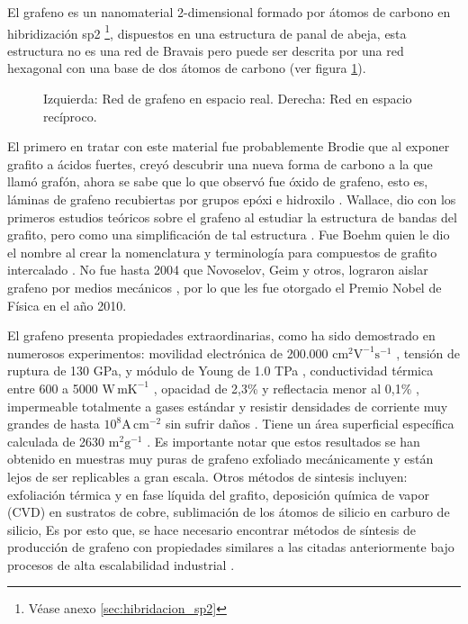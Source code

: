 
El grafeno es un nanomaterial 2-dimensional formado por átomos de carbono en hibridización sp2 \footnote{Véase anexo \ref{sec:hibridacion_sp2}}, dispuestos en una estructura de panal de abeja, esta estructura no es una red de Bravais pero puede ser descrita por una red hexagonal con una base de dos átomos de carbono (ver figura \ref{fig_graphene_lattice}). 

\begin{figure}
	\centering
	\caption[Estructura cristalina del grafeno]{Izquierda: Red de grafeno en espacio real. Derecha: Red en espacio recíproco.}
	\label{fig_graphene_lattice}
\end{figure}

El primero en tratar con este material fue probablemente Brodie \citep{Brodie1859} que al exponer grafito a ácidos fuertes, creyó descubrir una nueva forma de carbono a la que llamó grafón, ahora se sabe que lo que observó fue óxido de grafeno, esto es, láminas de grafeno recubiertas por grupos epóxi e hidroxilo \citep{Geim2012}. Wallace, dio con los primeros estudios teóricos sobre el grafeno al estudiar la estructura de bandas del grafito, pero como una simplificación de tal estructura \citep{Wallace1947}. Fue Boehm quien le dio el nombre al crear la nomenclatura y terminología para compuestos de grafito intercalado \citep{Boehm1986}. No fue hasta 2004 que Novoselov, Geim y otros, lograron aislar grafeno por medios mecánicos \citep{Novoselov2004}, por lo que les fue otorgado el Premio Nobel de Física en el año 2010.

El grafeno presenta propiedades extraordinarias, como ha sido demostrado en numerosos experimentos: movilidad electrónica de 200.000 $\mathrm{cm^2 V^{-1} s^{-1} }$ \citep{Bolotin2008}, tensión de ruptura de 130 GPa, y módulo de Young de 1.0 TPa \citep{Lee2008}, conductividad térmica entre 600 a 5000 $\mathrm{W\, mK^{-1}}$ \citep{Balandin2011}, opacidad de 2,3\% y reflectacia menor al 0,1\% \citep{Nair2008}, impermeable totalmente a gases estándar \citep{Bunch2008} y resistir densidades de corriente muy grandes de hasta $\mathrm{10^8 A\, cm^{-2}}$ sin sufrir daños  \citep{Moser2007}. Tiene un área superficial específica calculada de 2630 $\mathrm{m^2 g^{-1}}$ \citep{Peigney2001}. Es importante notar que estos resultados se han obtenido en muestras muy puras de grafeno exfoliado mecánicamente \citep{Novoselov2004} y están lejos de ser replicables a gran escala. Otros métodos de sintesis incluyen: exfoliación térmica y en fase líquida del grafito\citep{Blake2008}, deposición química de vapor (CVD) en sustratos de cobre, sublimación de los átomos de silicio en carburo de silicio\citep{DeHeer2011a},   Es por esto que, se hace necesario encontrar métodos de síntesis de producción de grafeno con propiedades similares a las citadas anteriormente bajo procesos de alta escalabilidad industrial \citep{Novoselov2012}.

